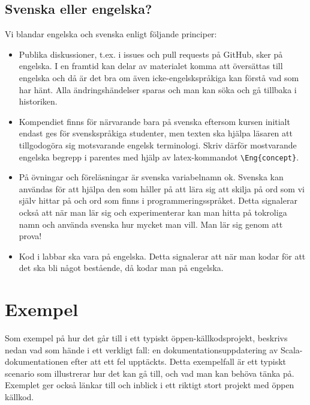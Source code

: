 \subsection{Svenska eller engelska?}

Vi blandar engelska och svenska enligt följande principer:

\begin{itemize}

\item Publika diskussioner, t.ex. i issues och pull requests på GitHub, sker på engelska. I en  framtid kan delar av materialet komma att översättas till engelska och då är det bra om även icke-engelskspråkiga kan förstå vad som har hänt. Alla ändringshändelser sparas och man kan söka och gå tillbaka i historiken.

\item Kompendiet finns för närvarande bara på svenska eftersom kursen initialt endast ges för svenskspråkiga studenter, men texten ska hjälpa läsaren att tillgodogöra sig motsvarande engelsk terminologi. Skriv därför mostvarande engelska begrepp  i parentes med hjälp av latex-kommandot \verb+\Eng{concept}+.

\item På övningar och föreläsningar är svenska variabelnamn ok. Svenska kan användas för att hjälpa den som håller på att lära sig att skilja på ord som vi själv hittar på och ord som finns i programmeringsspråket. Detta signalerar också att när man lär sig och experimenterar kan man hitta på tokroliga namn och använda svenska hur mycket man vill. Man lär sig genom att prova!

\item Kod i labbar ska vara på engelska. Detta signalerar att när man kodar för att det ska bli något bestående, då kodar man på engelska.

\end{itemize}

\section{Exempel}

Som exempel på hur det går till i ett typiskt öppen-källkodsprojekt, beskrivs nedan vad som hände i ett verkligt fall: en dokumentationsuppdatering av Scala-dokumentationen efter att ett fel upptäckts. Detta exempelfall är ett typiskt scenario som illustrerar hur det kan gå till, och vad man kan behöva tänka på. Exemplet ger också länkar till och inblick i ett riktigt stort projekt med öppen källkod.

